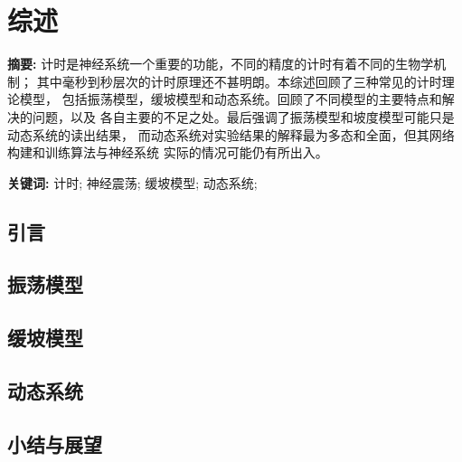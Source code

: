 \chapter{综述}

\begin{center}
\textbf{}
\end{center}

\bigskip
\noindent \textbf{摘要: \hspace{\Han}}
计时是神经系统一个重要的功能，不同的精度的计时有着不同的生物学机制；
其中毫秒到秒层次的计时原理还不甚明朗。本综述回顾了三种常见的计时理论模型，
包括振荡模型，缓坡模型和动态系统。回顾了不同模型的主要特点和解决的问题，以及
各自主要的不足之处。最后强调了振荡模型和坡度模型可能只是动态系统的读出结果，
而动态系统对实验结果的解释最为多态和全面，但其网络构建和训练算法与神经系统
实际的情况可能仍有所出入。

\bigskip
\noindent \textbf{关键词: \hspace{\Han}}
计时;\;
神经震荡;\;
缓坡模型;\;
动态系统;\;


\section*{引言}


%
\section*{振荡模型}

\section*{缓坡模型}

\section*{动态系统}


%

\section*{小结与展望}


